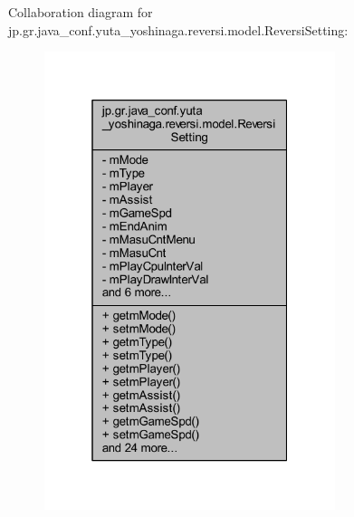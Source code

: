 Collaboration diagram for jp.\+gr.\+java\+\_\+conf.\+yuta\+\_\+yoshinaga.\+reversi.\+model.\+Reversi\+Setting\+:\nopagebreak
\begin{figure}[H]
\begin{center}
\leavevmode
\includegraphics[width=241pt]{classjp_1_1gr_1_1java__conf_1_1yuta__yoshinaga_1_1reversi_1_1model_1_1_reversi_setting__coll__graph}
\end{center}
\end{figure}
